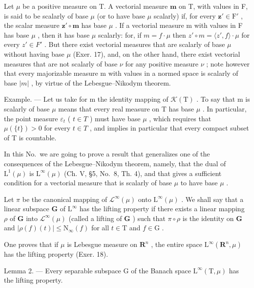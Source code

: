 Let \(\mu\) be a positive measure on T. A vectorial measure \(\mathbf{m}\) on T, with values in F, is said to be scalarly of base \(\mu\) (or to have base \(\mu\) scalarly) if, for every \(\mathbf{z}' \in \mathrm{F}'\) , the scalar measure \(\mathbf{z}' \circ \mathbf{m}\) has base \(\mu\) . If a vectorial measure m with values in F has base \(\mu\) , then it has base \(\mu\) scalarly: for, if \(m = f \cdot \mu\) then \(z' \circ m = \langle z', f \rangle \cdot \mu\) for every \(z' \in F'\) . But there exist vectorial measures that are scalarly of base \(\mu\) without having base \(\mu\) (Exer. 17), and, on the other hand, there exist vectorial measures that are not scalarly of base \(\nu\) for any positive measure \(\nu\) ; note however that every majorizable measure m with values in a normed space is scalarly of base \(|m|\) , by virtue of the Lebesgue--Nikodym theorem.

Example. --- Let us take for m the identity mapping of \(\mathcal{K}(\mathrm{T})\) . To say that m is scalarly of base \(\mu\) means that every real measure on T has base \(\mu\) . In particular, the point measure \(\varepsilon_{t}\) ( \(t \in T\) ) must have base \(\mu\) , which requires that \(\mu(\{t\}) > 0\) for every \(t \in T\) , and implies in particular that every compact subset of T is countable.

In this No.~we are going to prove a result that generalizes one of the consequences of the Lebesgue--Nikodym theorem, namely, that the dual of \(\mathrm{L}^{1}(\mu)\) is \(\mathrm{L}^{\infty}(\mu)\) (Ch. V, §5, No.~8, Th. 4), and that gives a sufficient condition for a vectorial measure that is scalarly of base \(\mu\) to have base \(\mu\) .

Let \(\pi\) be the canonical mapping of \(\mathcal{L}^{\infty}(\mu)\) onto \(\mathrm{L}^{\infty}(\mu)\) . We shall say that a linear subspace \(\mathbf{G}\) of \(\mathrm{L}^{\infty}\) has the lifting property if there exists a linear mapping \(\rho\) of \(\mathbf{G}\) into \(\mathcal{L}^{\infty}(\mu)\) (called a lifting of \(\mathbf{G}\) ) such that \(\pi \circ \rho\) is the identity on \(\mathbf{G}\) and \(|\rho(f)(t)| \leqslant \mathrm{N}_{\infty}(f)\) for all \(t \in \mathrm{T}\) and \(f \in \mathrm{G}\) .

One proves that if \(\mu\) is Lebesgue measure on \(\mathbf{R}^n\) , the entire space \(\mathrm{L}^{\infty}(\mathbf{R}^{n},\mu)\) has the lifting property (Exer. 18).

Lemma 2. --- Every separable subspace G of the Banach space \(\mathrm{L}^{\infty}(\mathrm{T},\mu)\) has the lifting property.

